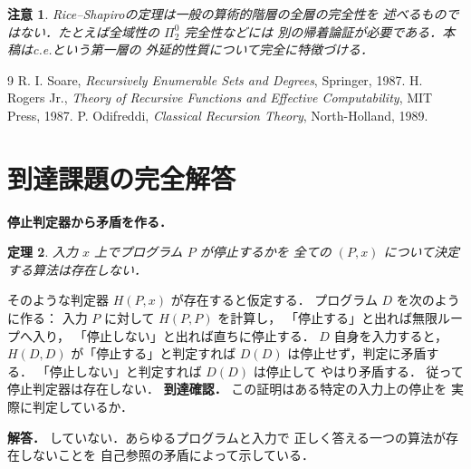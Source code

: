 \documentclass[a5paper,10pt,onecolumn]{jsarticle}
\makeatletter
\theoremstyle{mathnotetheorem}
\newtheorem{theorem}{定理}[section]
\newtheorem{remark}[theorem]{注意}
\renewcommand{\proofname}{証明}
\renewenvironment{proof}[1][\proofname]{%
  \par\pushQED{\qed}\normalfont\topsep4\p@\@plus2\p@\relax
  \trivlist\item[\hskip\labelsep\bfseries #1]\ignorespaces
}{\popQED\endtrivlist\@endpefalse}
\makeatother
\begin{document}
\begin{remark}
Rice--Shapiroの定理は一般の算術的階層の全層の完全性を
述べるものではない．たとえば全域性の $\Pi^0_2$ 完全性などには
別の帰着論証が必要である．本稿はc.e.という第一層の
外延的性質について完全に特徴づける．
\end{remark}

\begin{thebibliography}{9}
 R. I. Soare, \emph{Recursively Enumerable Sets and Degrees},
 Springer, 1987.
 H. Rogers Jr., \emph{Theory of Recursive Functions and
 Effective Computability}, MIT Press, 1987.
 P. Odifreddi, \emph{Classical Recursion Theory},
 North-Holland, 1989.
\end{thebibliography}

\section{到達課題の完全解答}
\noindent\textbf{停止判定器から矛盾を作る．}
\begin{theorem}
入力 $x$ 上でプログラム $P$ が停止するかを
全ての $(P,x)$ について決定する算法は存在しない．
\end{theorem}
\begin{proof}
そのような判定器 $H(P,x)$ が存在すると仮定する．
プログラム $D$ を次のように作る：
入力 $P$ に対して $H(P,P)$ を計算し，
「停止する」と出れば無限ループへ入り，
「停止しない」と出れば直ちに停止する．
$D$ 自身を入力すると，
$H(D,D)$ が「停止する」と判定すれば
$D(D)$ は停止せず，判定に矛盾する．
「停止しない」と判定すれば $D(D)$ は停止して
やはり矛盾する．
従って停止判定器は存在しない．
\end{proof}
\noindent\textbf{到達確認．}
この証明はある特定の入力上の停止を
実際に判定しているか．
\par\noindent\textbf{解答．}
していない．あらゆるプログラムと入力で
正しく答える一つの算法が存在しないことを
自己参照の矛盾によって示している．
\end{document}
